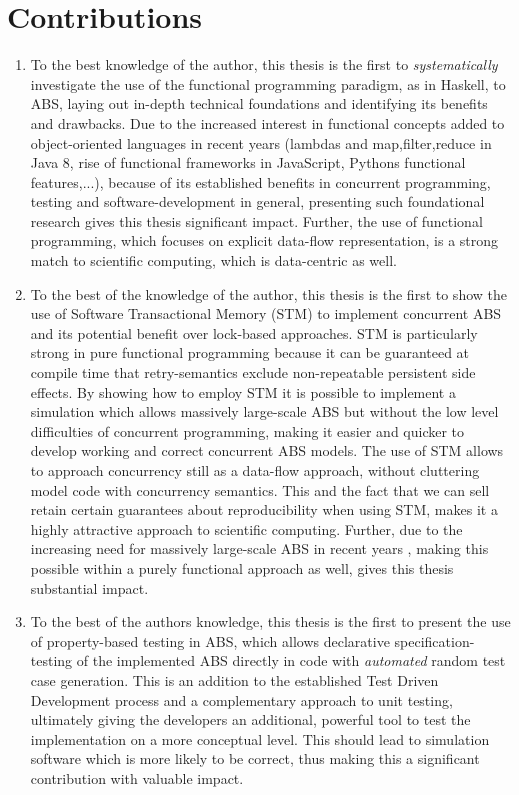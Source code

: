 \section{Contributions}
\begin{enumerate}
	\item To the best knowledge of the author, this thesis is the first to \textit{systematically} investigate the use of the functional programming paradigm, as in Haskell, to ABS, laying out in-depth technical foundations and identifying its benefits and drawbacks. Due to the increased interest in functional concepts added to object-oriented languages in recent years (lambdas and map,filter,reduce in Java 8, rise of functional frameworks in JavaScript, Pythons functional features,...), because of its established benefits in concurrent programming, testing and software-development in general, presenting such foundational research gives this thesis significant impact. Further, the use of functional programming, which focuses on explicit data-flow representation, is a strong match to scientific computing, which is data-centric as well.
	
	\item To the best of the knowledge of the author, this thesis is the first to show the use of Software Transactional Memory (STM) to implement concurrent ABS and its potential benefit over lock-based approaches. STM is particularly strong in pure functional programming because it can be guaranteed  at compile time that retry-semantics exclude non-repeatable persistent side effects. By showing how to employ STM it is possible to implement a simulation which allows massively large-scale ABS but without the low level difficulties of concurrent programming, making it easier and quicker to develop working and correct concurrent ABS models. The use of STM allows to approach concurrency still as a data-flow approach, without cluttering model code with concurrency semantics. This and the fact that we can sell retain certain guarantees about reproducibility when using STM, makes it a highly attractive approach to scientific computing. Further, due to the increasing need for massively large-scale ABS in recent years \cite{lysenko_framework_2008}, making this possible within a purely functional approach as well, gives this thesis substantial impact.
	
	\item To the best of the authors knowledge, this thesis is the first to present the use of property-based testing in ABS, which allows declarative specification-testing of the implemented ABS directly in code with \textit{automated} random test case generation. This is an addition to the established Test Driven Development process and a complementary approach to unit testing, ultimately giving the developers an additional, powerful tool to test the implementation on a more conceptual level. This should lead to simulation software which is more likely to be correct, thus making this a significant contribution with valuable impact.


\end{enumerate}
